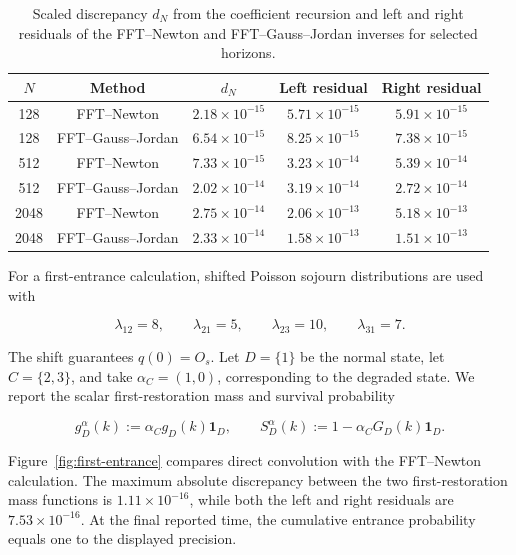 \documentclass[3p,12pt,authoryear]{elsarticle}
\theoremstyle{definition}
\theoremstyle{remark}
\newcommand{\one}{\mathbf 1}
\begin{document}
\begin{table}[H]
\centering
\small
\begin{tabular}{ccccc}
\toprule
$N$ & Method & $d_N$ & Left residual & Right residual\\
\midrule
128 & FFT--Newton & $2.18\times10^{-15}$ & $5.71\times10^{-15}$ & $5.91\times10^{-15}$\\
128 & FFT--Gauss--Jordan & $6.54\times10^{-15}$ & $8.25\times10^{-15}$ & $7.38\times10^{-15}$\\
512 & FFT--Newton & $7.33\times10^{-15}$ & $3.23\times10^{-14}$ & $5.39\times10^{-14}$\\
512 & FFT--Gauss--Jordan & $2.02\times10^{-14}$ & $3.19\times10^{-14}$ & $2.72\times10^{-14}$\\
2048 & FFT--Newton & $2.75\times10^{-14}$ & $2.06\times10^{-13}$ & $5.18\times10^{-13}$\\
2048 & FFT--Gauss--Jordan & $2.33\times10^{-14}$ & $1.58\times10^{-13}$ & $1.51\times10^{-13}$\\
\bottomrule
\end{tabular}
\caption{Scaled discrepancy $d_N$ from the coefficient recursion and left and right residuals of the FFT--Newton and FFT--Gauss--Jordan inverses for selected horizons.}
\label{tab:inverse-accuracy}
\end{table}

For a first-entrance calculation, shifted Poisson sojourn distributions are used with

\begin{equation*}
\lambda_{12}=8,
\qquad
\lambda_{21}=5,
\qquad
\lambda_{23}=10,
\qquad
\lambda_{31}=7.
\end{equation*}

The shift guarantees $q(0)=O_s$. Let $D=\{1\}$ be the normal state, let $C=\{2,3\}$, and take $\alpha_C=(1,0)$, corresponding to the degraded state. We report the scalar first-restoration mass and survival probability

\begin{equation*}
 g_D^{\alpha}(k):=\alpha_Cg_D(k)\one_D,
 \qquad
 S_D^{\alpha}(k):=1-\alpha_CG_D(k)\one_D.
\end{equation*}

Figure~\ref{fig:first-entrance} compares direct convolution with the FFT--Newton calculation. The maximum absolute discrepancy between the two first-restoration mass functions is $1.11\times10^{-16}$, while both the left and right residuals are $7.53\times10^{-16}$. At the final reported time, the cumulative entrance probability equals one to the displayed precision.
\end{document}
